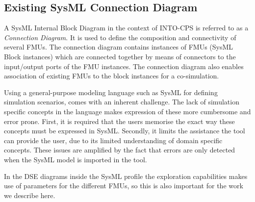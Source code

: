 \subsection{Existing SysML Connection Diagram}\label{sec:sysml}

A SysML Internal Block Diagram in the context of INTO-CPS is referred to as a \emph{Connection Diagram}.
It is used to define the composition and connectivity of several FMUs. The connection diagram contains instances of FMUs (SysML Block instances) which are connected together by means of connectors to the input/output ports of the FMU instances. The connection diagram also enables association of existing FMUs to the block instances for a co-simulation.



Using a general-purpose modeling language such as SysML for defining simulation scenarios, comes with an inherent challenge.
The lack of simulation specific concepts in the language makes expression of these more cumbersome and error prone.
First, it is required that the users memorise the exact way these concepts must be expressed in SysML.
Secondly, it limits the assistance the tool can provide the user, due to its limited understanding of domain specific concepts.  
These issues are amplified by the fact that errors are only detected when the SysML model is imported in the tool.

In the DSE diagrams inside the SysML profile the exploration capabilities makes use of parameters for the different FMUs, so this is also important for the work we describe here.
